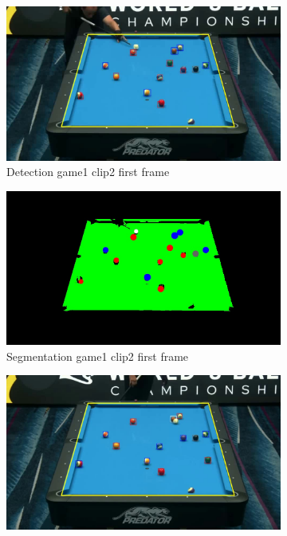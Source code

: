 \begin{figure}[H]
    \centering
    \begin{subfigure}[b]{0.35\textwidth}
        \centering
        \includegraphics[width=\textwidth]{images/Detection/game1_clip2_detected_balls_first_frame.jpg}
        \caption{Detection game1 clip2 first frame}
        \label{fig: game1_clip2_first_frame_detected}
    \end{subfigure}
    \begin{subfigure}[b]{0.35\textwidth}
        \centering
        \includegraphics[width=\textwidth]{images/Segmentation/game1_clip2_segmented_balls_first_frame.jpg}
        \caption{Segmentation game1 clip2 first frame}
		\label{fig: game1_clip2_first_frame_segmented}
    \end{subfigure}
    \begin{subfigure}[b]{0.35\textwidth}
        \centering
        \includegraphics[width=\textwidth]{images/Detection/game1_clip2_detected_balls_last_frame.jpg}

\end{subfigure}
\end{figure}
